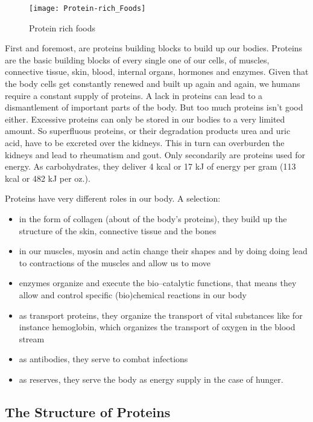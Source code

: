 \documentclass[../main.tex]{subfiles}
\begin{document}
\begin{figure}[htb!]
\centering
  \texttt{[image: Protein-rich\_Foods]}
  \caption{Protein rich foods\cite{Proteins}}
\end{figure}

First and foremost, are proteins building blocks to build up our bodies.
Proteins are the basic building blocks of every single one of our cells, of muscles, connective tissue, skin,
blood, internal organs, hormones and enzymes.
Given that the body cells get constantly renewed and built up again and again, we humans require a constant supply of proteins.
A lack in proteins can lead to a dismantlement of important parts of the body.
But too much proteins isn't good either.
Excessive proteins can only be stored in our bodies to a very limited amount.
So superfluous proteins, or their degradation products urea and uric acid, have to be excreted over the kidneys.
This in turn can overburden the kidneys and lead to rheumatism and gout.
Only secondarily are proteins used for energy.
As carbohydrates, they deliver 4 kcal or 17 kJ of energy per gram (113 kcal or 482 kJ per oz.).

Proteins have very different roles in our body. A selection:
\begin{itemize}
\item in the form of collagen (about  of the body's proteins), they build up the structure of the skin, connective tissue and the bones
\item in our muscles, myosin and actin change their shapes and by doing doing lead to contractions of the muscles and allow us to move
\item enzymes organize and execute the bio--catalytic functions, that means they allow  and control specific (bio)chemical reactions in our body
\item as transport proteins, they organize the transport of vital substances like for instance hemoglobin, which organizes the transport of oxygen in the blood stream
\item as antibodies, they serve to combat infections
  \item as reserves, they serve the body as energy supply in the case of hunger.
  \end{itemize}

  \subsection{The Structure of Proteins}
\end{document}
